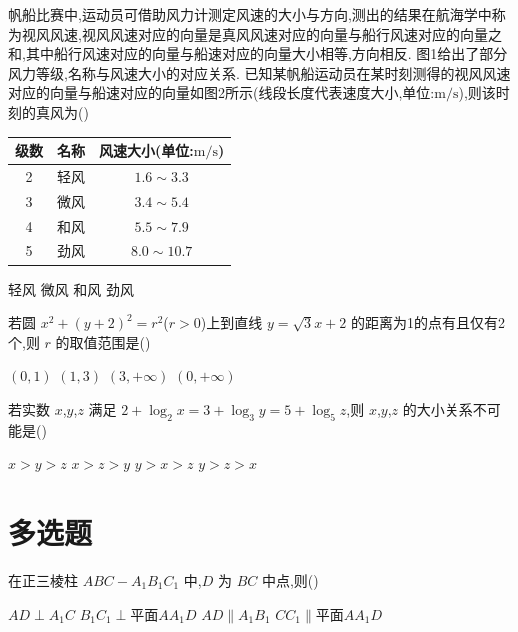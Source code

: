 \begin{problem}

帆船比赛中,运动员可借助风力计测定风速的大小与方向,测出的结果在航海学中称为视风风速,视风风速对应的向量是真风风速对应的向量与船行风速对应的向量之和,其中船行风速对应的向量与船速对应的向量大小相等,方向相反.
图1给出了部分风力等级,名称与风速大小的对应关系.
已知某帆船运动员在某时刻测得的视风风速对应的向量与船速对应的向量如图2所示(线段长度代表速度大小,单位:\(\mathrm{m/s}\)),则该时刻的真风为(\quad)

\begin{center}
\begin{tabular}{|c|c|c|}
\hline
级数 & 名称 & 风速大小(单位:\(\mathrm{m/s}\)) \\
\hline
2 & 轻风 & \(1.6\sim3.3\) \\
\hline
3 & 微风 & \(3.4\sim5.4\) \\
\hline
4 & 和风 & \(5.5\sim7.9\) \\
\hline
5 & 劲风 & \(8.0\sim10.7\) \\
\hline
\end{tabular}
\end{center}


\choices
    {轻风}
    {微风}
    {和风}
    {劲风}
\end{problem}

\begin{problem}
若圆 \(x^2 + (y+2)^2 = r^2\)(\(r>0\))上到直线 \(y = \sqrt{3}x + 2\) 的距离为1的点有且仅有2个,则 \(r\) 的取值范围是(\quad)

\choices
    {\((0,1)\)}
    {\((1,3)\)}
    {\((3,+\infty)\)}
    {\((0,+\infty)\)}
\end{problem}

\begin{problem}
若实数 \(x\),\(y\),\(z\) 满足 \(2 + \log_2 x = 3 + \log_3 y = 5 + \log_5 z\),则 \(x\),\(y\),\(z\) 的大小关系不可能是(\quad)

\choices
    {\(x > y > z\)}
    {\(x > z > y\)}
    {\(y > x > z\)}
    {\(y > z > x\)}
\end{problem}

\section{多选题}

\begin{problem}
在正三棱柱 \(ABC - A_1B_1C_1\) 中,\(D\) 为 \(BC\) 中点,则(\quad)

\choices
    {\(AD \perp A_1C\)}
    {\(B_1C_1 \perp \text{平面} AA_1D\)}
    {\(AD \parallel A_1B_1\)}
    {\(CC_1 \parallel \text{平面} AA_1D\)}
\end{problem}

